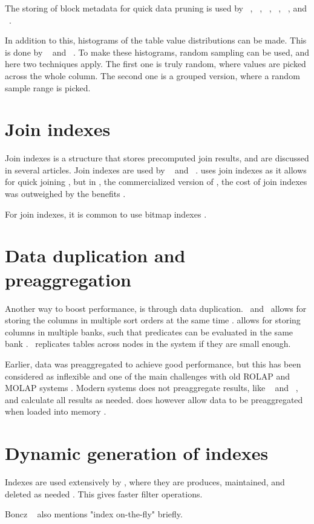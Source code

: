 The storing of block metadata for quick data pruning is used by \oracle~\cite{Lahiri2015-mz}, \ibm~\cite{Roman2013-em}, \vertica~\cite{Lamb2012-kg}, \monetx~\cite{Boncz2005-wj}, \mssql~\cite{Larson2013-mc}, and \exasol~\cite{Exasol2014-xh}.

In addition to this, histograms of the table value distributions can be made. This is done by \ibm~\cite{Raman2013-em, Raman2008-gi} and \mssql~\cite{Larson2013-mc}. To make these histograms, random sampling can be used, and here two techniques apply. The first one is truly random, where values are picked across the whole column. The second one is a grouped version, where a random sample range is picked.

\section{Join indexes}
\label{sec:Join indexes}
Join indexes is a structure that stores precomputed join results, and are discussed in several articles. Join indexes are used by \monetdb~\cite{Boncz2002-yj} and \monetx~\cite{Boncz2005-wj}.  \cstore uses join indexes as it allows for quick joining \cite{Stonebraker2005-qz}, but in \vertica, the commercialized version of \cstore, the cost of join indexes was outweighed by the benefits \cite{Lamb2012-kg}.

For join indexes, it is common to use bitmap indexes \cite{Bjorklund2011-wh}.

\section{Data duplication and preaggregation}
\label{sec:Data duplication and preaggregation}
Another way to boost performance, is through data duplication. \cstore~and \vertica~allows for storing the columns in multiple sort orders at the same time \cite{Stonebraker2005-qz, Lamb2012-kg}. \blink allows for storing columns in multiple banks, such that predicates can be evaluated in the same bank \cite{Johnson2008-cp}. \exasol~replicates tables across nodes in the system if they are small enough.

Earlier, data was preaggregated to achieve good performance, but this has been considered as inflexible and one of the main challenges with old ROLAP and MOLAP systems \cite{Boncz2002-yj}. Modern systems does not preaggregate results, like \sapnw~\cite{Lemke2010-is} and \qlikview~\cite{Qlik2014-vd}, and calculate all results as needed. \qlikview does however allow data to be preaggregated when loaded into memory \cite{Qlik2011-yc}.

\section{Dynamic generation of indexes}
\label{sec:Dynamic generation of indexes}
Indexes are used extensively by \exasol, where they are produces, maintained, and deleted as needed \cite{Exasol2014-xh}. This gives faster filter operations.

Boncz \ea~\cite{Boncz2006-md} also mentions "index on-the-fly" briefly.

